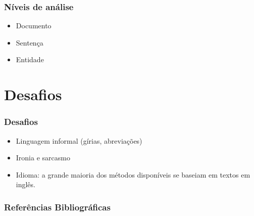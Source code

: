 \documentclass{beamer}
\begin{document}
\begin{frame}%
\frametitle{\textbf{Níveis de análise}\transdissolve}%
\begin{itemize}%
\item<1->Documento
\item<2->Sentença
\item<3->Entidade
\end{itemize}
\end{frame}


\section{Desafios}
\begin{frame}%
\frametitle{\textbf{Desafios}\transdissolve}%
\begin{itemize}%
\item<1->Linguagem informal (gírias, abreviações)
\item<2->Ironia e sarcasmo
\item<3->Idioma: a grande maioria dos métodos disponíveis se baseiam em textos em inglês.

\end{itemize}
\end{frame}

\begin{frame}
\frametitle{Referências Bibliográficas}

\end{frame}
\end{document}
